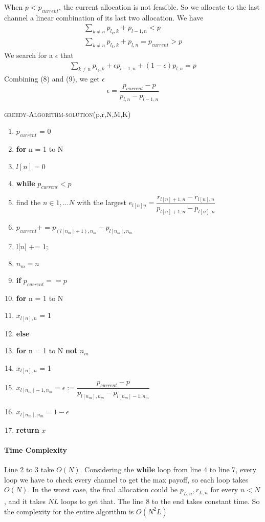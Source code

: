 \documentclass[11pt, oneside]{report}
\begin{document}
When $p < p_{current}$, the current allocation is not feasible. So we allocate to the last channel a linear combination of its last two allocation. We have
\begin{align}
\sum_{k \ne n} p_{l_k,k} + p_{l-1,n} < p \\
\sum_{k \ne n} p_{l_k,k} + p_{l,n} = p_{current} > p
\end{align}
We search for a $\epsilon$ that
\begin{align}
\sum_{k \ne n} p_{l_k,k} + \epsilon p_{l-1,n} + (1-\epsilon) p_{l,n} = p
\end{align}
Combining (8) and (9), we get $\epsilon$
$$ \epsilon = \dfrac{p_{current} - p}{p_{l,n} - p_{l-1,n}}$$

\noindent\textsc{greedy-Algorithm-solution}(p,r,N,M,K)
\begin{enumerate}[1\ ]
\setlength{\topsep}{0.05ex}
\setlength{\itemsep}{0.05ex}
\item $p_{current}$ = 0
\item \textbf{for} n = 1 to N
\item \qquad $l[n] = 0$
\item \textbf{while} $p_{current} < p$
\item \qquad  find the $n \in {1,...N}$ with the largest $e_{l[n]n} = \dfrac{r_{l[n]+1,n} - r_{l[n],n}}{p_{l[n]+1,n} - p_{l[n],n}}$
\item \qquad  $p_{current} += p_{(l[n_{m}] + 1), n_{m}} - p_{l[n_{m}], n_{m}}$
\item \qquad  l[$n$] += 1;
\item \qquad $n_m = n$
\item \textbf{if} $p_{current} == p$
\item \qquad \textbf{for} n = 1 to N
\item \qquad \qquad $x_{l[n],n}$ = 1
\item \textbf{else}
\item \qquad \textbf{for} n = 1 to N \textbf{not} $n_m$
\item \qquad \qquad $x_{l[n],n}$ = 1
\item \qquad $x_{l[n_m] - 1,n_m} = \epsilon := \dfrac{p_{current} - p}{p_{l[n_m],n_m} - p_{l[n_m]-1,n_m}}$
\item \qquad $x_{l[n_m],n_m} = 1 - \epsilon$
\item \textbf{return} $x$
\end{enumerate}

\paragraph{Time Complexity} Line 2 to 3 take $O(N)$. Considering the \textbf{while} loop from line 4 to line 7, every loop we have to check every channel to get the max payoff, so each loop takes $O(N)$. In the worst case, the final allocation could be $p_{L,n}, r_{L,n}$ for every $n < N$, and it takes $NL$ loops to get that. The line 8 to the end  takes constant time. So the complexity for the entire algorithm is $O(N^2L)$
\end{document}
